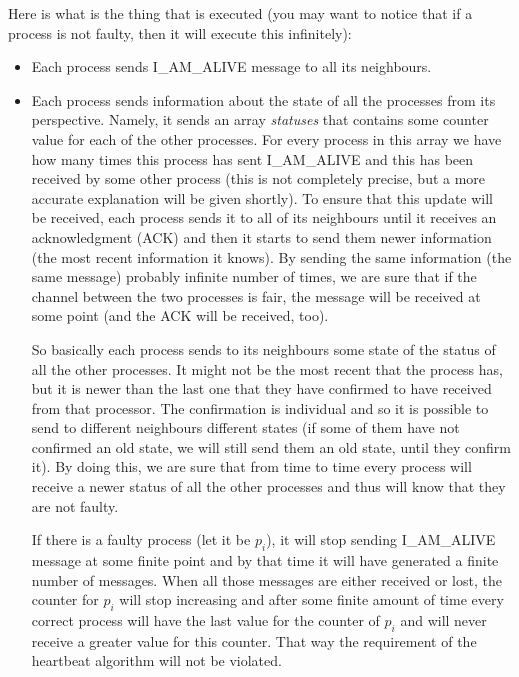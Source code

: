 \documentclass[12pt]{article}
\theoremstyle{plain}
\begin{document}
Here is what is the thing that is executed (you may want to notice that if a 
process is not faulty, then it will execute this infinitely):
\begin{itemize}
  \item Each process sends I\_AM\_ALIVE message to all its neighbours.
  \item Each process sends information about the state of all the processes 
    from its perspective. Namely, it sends an array \emph{statuses} that contains
    some counter value for each of the other processes. For every process in
    this array we have how many times this process has sent I\_AM\_ALIVE and
    this has been received by some other process (this is not completely
    precise, but a more accurate explanation will be given shortly). To ensure
    that this update will be received, each process sends it to all of its 
    neighbours until it receives an acknowledgment (ACK) and then it starts to
    send them newer information (the most recent information it knows). By
    sending the same information (the same message) probably infinite number of
    times, we are sure that if the channel between the two processes is fair,
    the message will be received at some point (and the ACK will be received,
    too).

    So basically each process sends to its neighbours some state of the status
    of all the other processes. It might not be the most recent that the process
    has, but it is newer than the last one that they have confirmed to have
    received from that processor. The confirmation is individual and so it is
    possible to send to different neighbours different states (if some of them 
    have not confirmed an old state, we will still send them an old state,
    until they confirm it). By doing this, we are sure that from time to time
    every process will receive a newer status of all the other processes and
    thus will know that they are not faulty. 

    If there is a faulty process (let it be $p_i$), it will stop sending
    I\_AM\_ALIVE message at some finite point and by that time it will have
    generated a finite number of messages. When all those messages are either
    received or lost, the counter for $p_i$ will stop increasing and after 
    some finite amount of time every correct process will have the last value
    for the counter of $p_i$ and will never receive a greater value for this
    counter. That way the requirement of the heartbeat algorithm will not be
    violated.


\end{itemize}
\end{document}
